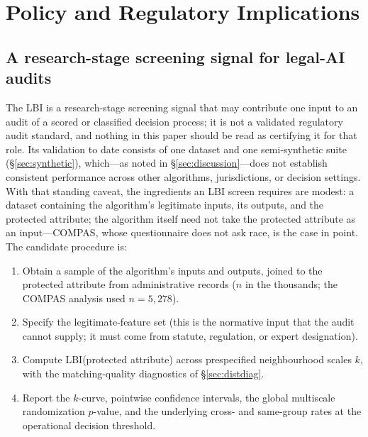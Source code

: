 \documentclass[11pt]{article}
\begin{document}
\section{Policy and Regulatory Implications}
\label{sec:policy}

\subsection{A research-stage screening signal for legal-AI audits}

The LBI is a research-stage screening signal that may contribute one
input to an audit of a scored or classified decision process; it is
not a validated regulatory audit standard, and nothing in this paper
should be read as certifying it for that role. Its validation to date
consists of one dataset and one semi-synthetic suite
(\S\ref{sec:synthetic}), which---as noted in
\S\ref{sec:discussion}---does not establish consistent performance
across other algorithms, jurisdictions, or decision settings. With
that standing caveat, the ingredients an LBI screen requires are
modest: a dataset containing the algorithm's legitimate inputs, its
outputs, and the protected attribute; the algorithm itself need not
take the protected attribute as an input---COMPAS, whose
questionnaire does not ask race, is the case in point. The candidate
procedure is:

\begin{enumerate}[leftmargin=*]
\item Obtain a sample of the algorithm's inputs and outputs, joined
to the protected attribute from administrative records ($n$ in the
thousands; the COMPAS analysis used $n = 5{,}278$).
\item Specify the legitimate-feature set (this is the normative input
that the audit cannot supply; it must come from statute,
regulation, or expert designation).
\item Compute LBI(protected attribute) across prespecified
neighbourhood scales $k$, with the matching-quality diagnostics of
\S\ref{sec:distdiag}.
\item Report the $k$-curve, pointwise confidence intervals, the
global multiscale randomization $p$-value, and the underlying
cross- and same-group rates at the operational decision threshold.
\end{enumerate}
\end{document}
